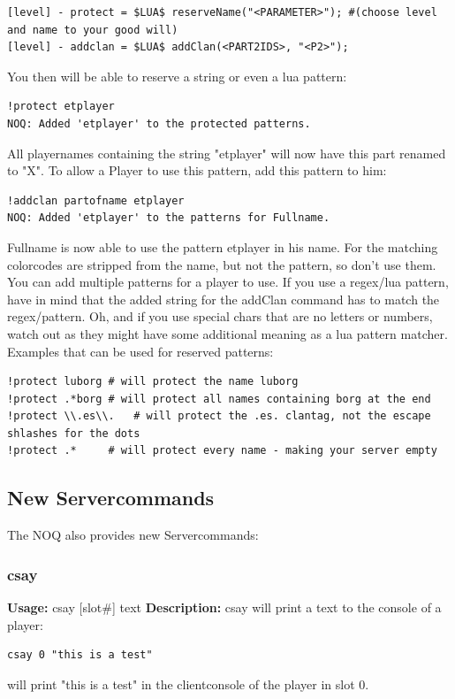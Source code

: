 \documentclass[12pt,a4paper]{article}
\begin{document}
\begin{lstlisting}
[level] - protect = $LUA$ reserveName("<PARAMETER>"); #(choose level and name to your good will)
[level] - addclan = $LUA$ addClan(<PART2IDS>, "<P2>"); 
\end{lstlisting}

You then will be able to reserve a string or even a lua pattern: 

\begin{lstlisting}
!protect etplayer
NOQ: Added 'etplayer' to the protected patterns.
\end{lstlisting}

All playernames containing the string "etplayer" will now have this part renamed to "X".
To allow a Player to use this pattern, add this pattern to him:


\begin{lstlisting}
!addclan partofname etplayer
NOQ: Added 'etplayer' to the patterns for Fullname.
\end{lstlisting}

Fullname is now able to use the pattern etplayer in his name. For the matching colorcodes are stripped from the name, but not the pattern, so don't use them.
You can add multiple patterns for a player to use. If you use a regex/lua pattern, have in mind that the added string for the addClan command has to match the regex/pattern. 
Oh, and if you use special chars that are no letters or numbers, watch out as they might have some additional meaning as a lua pattern matcher.
Examples that can be used for reserved patterns:

\begin{lstlisting}
!protect luborg # will protect the name luborg
!protect .*borg # will protect all names containing borg at the end
!protect \\.es\\.	# will protect the .es. clantag, not the escape shlashes for the dots
!protect .*		# will protect every name - making your server empty 
\end{lstlisting}

\subsection{New Servercommands}
The NOQ also provides new Servercommands:

\subsubsection{csay}
\textbf{Usage:} \hfill csay [slot\#] text \linebreak
\textbf{Description:} \linebreak
csay will print a text to the console of a player:
\begin{lstlisting}
csay 0 "this is a test"
\end{lstlisting}
will print "this is a test" in the clientconsole of the player in slot 0.
\end{document}
